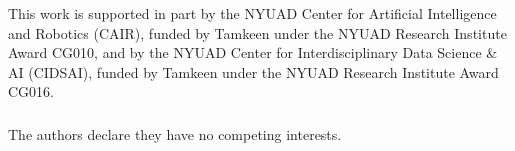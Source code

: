 \documentclass[runningheads]{llncs}
\begin{document}
\begin{credits}

\subsubsection{\ackname}
This work is supported in part by the NYUAD Center for Artificial Intelligence and Robotics (CAIR), funded by Tamkeen under the NYUAD Research Institute Award CG010, and by the NYUAD Center for Interdisciplinary Data Science \& AI (CIDSAI), funded by Tamkeen under the NYUAD Research Institute Award CG016.

\subsubsection{\discintname}
The authors declare they have no competing interests.

\end{credits}






\end{document}
